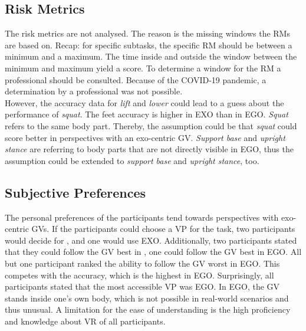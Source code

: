 \subsection{Risk Metrics}
The risk metrics are not analysed. The reason is the missing windows the RMs are based on. Recap: for specific subtasks, the specific RM should be between a minimum and a maximum. The time inside and outside the window between the minimum and maximum yield a score. To determine a window for the RM a professional should be consulted. Because of the COVID-19 pandemic, a determination by a professional was not possible.\\
However, the accuracy data for \textit{lift} and \textit{lower} could lead to a guess about the performance of \textit{squat}. The feet accuracy is higher in EXO than in EGO. \textit{Squat} refers to the same body part. Thereby, the assumption could be that \textit{squat} could score better in perspectives with an exo-centric GV. \textit{Support base} and \textit{upright stance} are referring to body parts that are not directly visible in EGO, thus the assumption could be extended to \textit{support base} and \textit{upright stance}, too.

\subsection{Subjective Preferences}
The personal preferences of the participants tend towards perspectives with exo-centric GVs. If the participants could choose a VP for the task, two participants would decide for \combi, and one would use EXO. Additionally, two participants stated that they could follow the GV best in \combi, one could follow the GV best in EGO. All but one participant ranked the ability to follow the GV worst in EGO. This competes with the accuracy, which is the highest in EGO. Surprisingly, all participants stated that the most accessible VP was EGO. In EGO, the GV stands inside one's own body, which is not possible in real-world scenarios and thus unusual. A limitation for the ease of understanding is the high proficiency and knowledge about VR of all participants.
